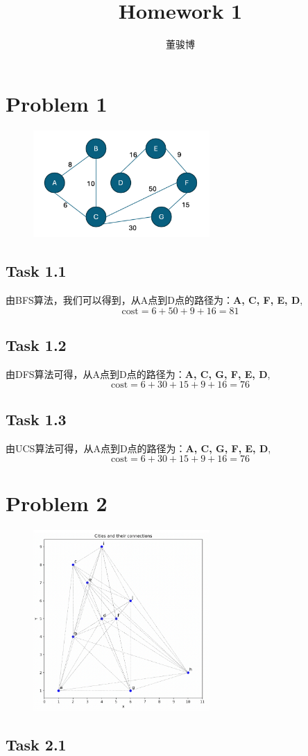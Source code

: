 \documentclass[onecolumn,oneside]{SUSTechHomework}
\author{董骏博}
\title{Homework 1}
\begin{document}
    \maketitle
  
    \section*{Problem 1}
    \begin{figure}[h]
        \centering
        \includegraphics[width=0.6\textwidth]{task1.png} %
        \label{fig:example} %
    \end{figure}
    \subsection*{Task 1.1}
    由BFS算法，我们可以得到，从A点到D点的路径为：\textbf{A, C, F, E, D},\[\text{cost} = 6 + 50 + 9 + 16 = 81 \]
    \subsection*{Task 1.2}
    由DFS算法可得，从A点到D点的路径为：\textbf{A, C, G, F, E, D},\[\text{cost} = 6 + 30 + 15 + 9 + 16 = 76 \]
    \subsection*{Task 1.3}
    由UCS算法可得，从A点到D点的路径为：\textbf{A, C, G, F, E, D},\[\text{cost} = 6 + 30 + 15 + 9 + 16 = 76 \]
    \newpage
    \section*{Problem 2}
    \begin{figure}[h]
        \centering
        \includegraphics[width=0.6\textwidth]{task2.png} %
        \label{fig:example} %
    \end{figure}
    \subsection*{Task 2.1}
    
\end{document}
